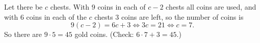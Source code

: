 Let there be $c$ chests. With $9$ coins in each of $c-2$ chests all coins are used, and with $6$ coins in each of the $c$ chests $3$ coins are left, so the number of coins is
\[9(c-2)=6c+3\iff3c=21\iff c=7.\]
So there are $9\cdot5=\boxed{45}$ gold coins. (Check: $6\cdot7+3=45$.)
